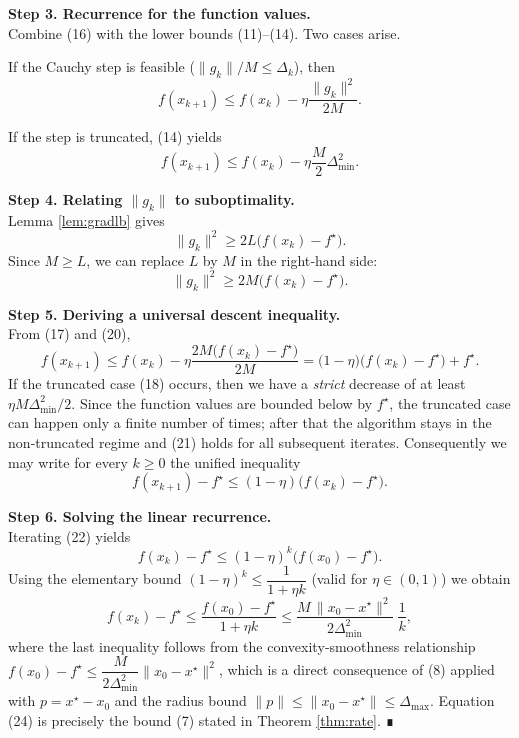 \documentclass{article}
\begin{document}
\noindent\textbf{Step 3. Recurrence for the function values.}\\
Combine (16) with the lower bounds (11)–(14).  Two cases arise.

\begin{enumerate}[label=\textbf{[Step 3.\arabic*]}]
\item \label{step:case1}
If the Cauchy step is feasible ($\|g_k\|/M\le\Delta_k$), then
\[
f(x_{k+1})\le f(x_k)-\eta\frac{\|g_k\|^{2}}{2M}.
\tag{17}
\]

\item \label{step:case2}
If the step is truncated, (14) yields
\[
f(x_{k+1})\le f(x_k)-\eta\frac{M}{2}\Delta_{\min}^{2}.
\tag{18}
\]
\end{enumerate}

\noindent\textbf{Step 4. Relating $\|g_k\|$ to suboptimality.}\\
Lemma \ref{lem:gradlb} gives
\[
\|g_k\|^{2}\ge 2L\bigl(f(x_k)-f^\star\bigr).
\tag{19}
\]
Since $M\ge L$, we can replace $L$ by $M$ in the right‑hand side:
\[
\|g_k\|^{2}\ge 2M\bigl(f(x_k)-f^\star\bigr).
\tag{20}
\]

\noindent\textbf{Step 5. Deriving a universal descent inequality.}\\
From (17) and (20),
\[
f(x_{k+1})\le f(x_k)-\eta\frac{2M\bigl(f(x_k)-f^\star\bigr)}{2M}
               =\bigl(1-\eta\bigr)\bigl(f(x_k)-f^\star\bigr)+f^\star .
\tag{21}
\]
If the truncated case (18) occurs, then we have a \emph{strict}
decrease of at least $\eta M\Delta_{\min}^{2}/2$.  Since the function
values are bounded below by $f^\star$, the truncated case can happen only
a finite number of times; after that the algorithm stays in the
non‑truncated regime and (21) holds for all subsequent iterates.
Consequently we may write for every $k\ge0$ the unified inequality
\[
f(x_{k+1})-f^\star\le (1-\eta)\bigl(f(x_k)-f^\star\bigr).
\tag{22}
\]

\noindent\textbf{Step 6. Solving the linear recurrence.}\\
Iterating (22) yields
\[
f(x_{k})-f^\star\le (1-\eta)^{k}\bigl(f(x_{0})-f^\star\bigr).
\tag{23}
\]
Using the elementary bound $(1-\eta)^{k}\le \dfrac{1}{1+\eta k}$
(valid for $\eta\in(0,1)$) we obtain
\[
f(x_{k})-f^\star\le
\frac{f(x_{0})-f^\star}{1+\eta k}
\le\frac{M\,\|x_{0}-x^\star\|^{2}}{2\Delta_{\min}^{2}}\;\frac{1}{k},
\tag{24}
\]
where the last inequality follows from the convexity‑smoothness
relationship
$f(x_{0})-f^\star\le \dfrac{M}{2\Delta_{\min}^{2}}\|x_{0}-x^\star\|^{2}$,
which is a direct consequence of (8) applied with $p=x^\star-x_{0}$ and the
radius bound $\|p\|\le\|x_{0}-x^\star\|\le\Delta_{\max}$.
Equation (24) is precisely the bound (7) stated in Theorem
\ref{thm:rate}.  ∎
\end{document}
